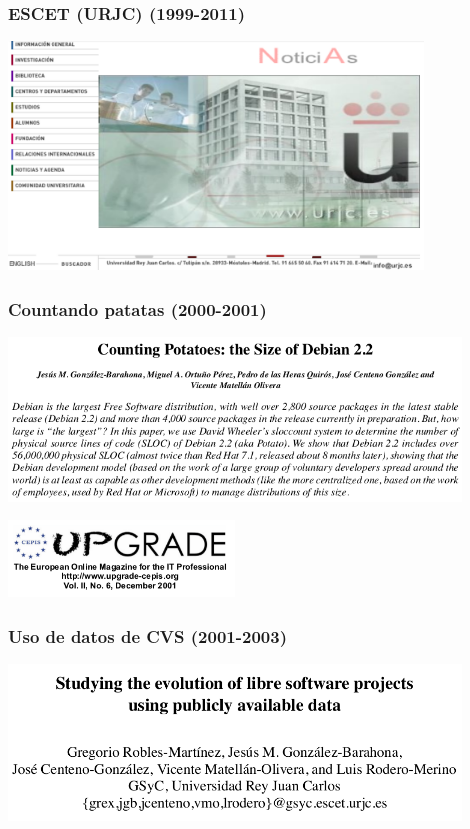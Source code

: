 \begin{frame}[fragile]
  \frametitle{ESCET (URJC) (1999-2011)}

  \begin{center}
  \includegraphics[width=11cm]{figs/web-urjc-2001}
  \end{center}  
  
\end{frame}

\begin{frame}[fragile]
  \frametitle{Countando patatas (2000-2001)}

  \begin{center}
  \includegraphics[width=12cm]{figs/counting-potatos}

  \includegraphics[width=6cm]{figs/upgrade}
  \end{center}  
  
\end{frame}

\begin{frame}[fragile]
  \frametitle{Uso de datos de CVS (2001-2003)}

  \begin{center}
  \includegraphics[width=12cm]{figs/evolution-data}
  \end{center}  
  
\end{frame}

